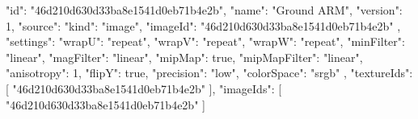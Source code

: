 {
  "id": "46d210d630d33ba8e1541d0eb71b4e2b",
  "name": "Ground ARM",
  "version": 1,
  "source": {
    "kind": "image",
    "imageId": "46d210d630d33ba8e1541d0eb71b4e2b"
  },
  "settings": {
    "wrapU": "repeat",
    "wrapV": "repeat",
    "wrapW": "repeat",
    "minFilter": "linear",
    "magFilter": "linear",
    "mipMap": true,
    "mipMapFilter": "linear",
    "anisotropy": 1,
    "flipY": true,
    "precision": "low",
    "colorSpace": "srgb"
  },
  "textureIds": [
    "46d210d630d33ba8e1541d0eb71b4e2b"
  ],
  "imageIds": [
    "46d210d630d33ba8e1541d0eb71b4e2b"
  ]
}
